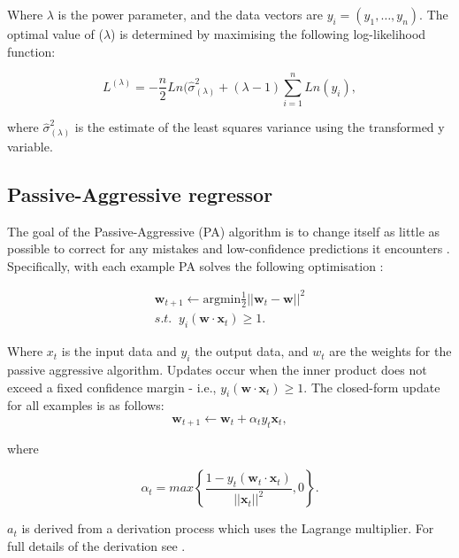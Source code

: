 \noindent Where $\lambda$ is the power parameter, and the data vectors are $y_i=(y_1,\ldots,y_n)$. The optimal value of ($\lambda$) is determined by maximising the following log-likelihood function:

\begin{equation}
L^{(\lambda)}=-\frac{n}{2}Ln(\hat{\sigma}^2_{(\lambda)}+(\lambda - 1)\sum_{i=1}^nLn(y_i),
\end{equation}

\noindent where $\hat{\sigma}^2_{(\lambda)}$ is the estimate of the least squares variance using the transformed y variable. 

\subsection{Passive-Aggressive regressor}

The goal of the Passive-Aggressive (PA) algorithm is to change itself as little as possible to correct for any mistakes and low-confidence predictions it encounters \cite{Gzik2014}. Specifically, with each example PA solves the following optimisation \cite{Ma2009}:

\begin{align}
\boldsymbol{w}_{t+1}\leftarrow \text{argmin} \frac{1}{2}\left|\left|{\boldsymbol{w}_t-\boldsymbol{w}}\right|\right|^2 \\
s.t. \; \; y_i(\boldsymbol{w}\cdot \boldsymbol{x}_t)\geq1.
\end{align}

\noindent Where $x_t$ is the input data and $y_i$ the output data, and $w_t$ are the weights for the passive aggressive algorithm. Updates occur when the inner product does not exceed a fixed confidence margin - i.e., $y_i(\boldsymbol{w}\cdot \boldsymbol{x}_t)\geq1$. The closed-form update for all examples is as follows:
\begin{equation}
\boldsymbol{w}_{t+1}\leftarrow \boldsymbol{w}_{t} + \alpha_t y_t \boldsymbol{x}_t,
\end{equation}

\noindent where 

\begin{equation}
\alpha_t=max\left\{\frac{1-y_t(\boldsymbol{w}_t\cdot\boldsymbol{x}_t)}{\left|\left|\boldsymbol{x}_t\right|\right|^2},0\right\}. 	
\end{equation}

\noindent $a_t$ is derived from a derivation process which uses the Lagrange multiplier. For full details of the derivation see \cite{Gzik2014}.














